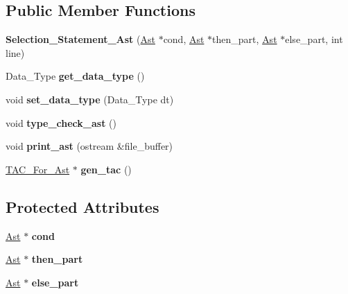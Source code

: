 \subsection*{Public Member Functions}
\begin{DoxyCompactItemize}
\item 
\mbox{\label{classSelection__Statement__Ast_afe2c0e8ecef6f9f70e5bd6aaab35b050}} 
{\bfseries Selection\+\_\+\+Statement\+\_\+\+Ast} (\hyperlink{classAst}{Ast} $\ast$cond, \hyperlink{classAst}{Ast} $\ast$then\+\_\+part, \hyperlink{classAst}{Ast} $\ast$else\+\_\+part, int line)
\item 
\mbox{\label{classSelection__Statement__Ast_ad8a3fa57a70813b1426751cdd9823bf1}} 
Data\+\_\+\+Type {\bfseries get\+\_\+data\+\_\+type} ()
\item 
\mbox{\label{classSelection__Statement__Ast_a670c5b65feb2efa70b3bdf9ef4a4f660}} 
void {\bfseries set\+\_\+data\+\_\+type} (Data\+\_\+\+Type dt)
\item 
\mbox{\label{classSelection__Statement__Ast_a7134fc00ad43b03ed998c3a51641734e}} 
void {\bfseries type\+\_\+check\+\_\+ast} ()
\item 
\mbox{\label{classSelection__Statement__Ast_ad90676ba363c20f3d1a8c0e968eec4eb}} 
void {\bfseries print\+\_\+ast} (ostream \&file\+\_\+buffer)
\item 
\mbox{\label{classSelection__Statement__Ast_a7a7ea512c507c0bcd1567aaca1d2c3ea}} 
\hyperlink{classTAC__For__Ast}{T\+A\+C\+\_\+\+For\+\_\+\+Ast} $\ast$ {\bfseries gen\+\_\+tac} ()
\end{DoxyCompactItemize}
\subsection*{Protected Attributes}
\begin{DoxyCompactItemize}
\item 
\mbox{\label{classSelection__Statement__Ast_a198883feab09f2c7c69d2b830546a391}} 
\hyperlink{classAst}{Ast} $\ast$ {\bfseries cond}
\item 
\mbox{\label{classSelection__Statement__Ast_a9d36cead58757ebdd7dbf17ce9b48e68}} 
\hyperlink{classAst}{Ast} $\ast$ {\bfseries then\+\_\+part}
\item 
\mbox{\label{classSelection__Statement__Ast_ad9357eab883e1dafbd67069dbb4a5db6}} 
\hyperlink{classAst}{Ast} $\ast$ {\bfseries else\+\_\+part}
\end{DoxyCompactItemize}
